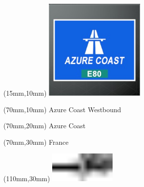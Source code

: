 \null\newpage
\begin{textblock*}{50mm}(15mm,10mm)%
\includegraphics[width=50mm]{LG/2015-05-20_00073.png}
\end{textblock*}
\begin{textblock*}{130mm}(70mm,10mm)%
{\fontsize{20}{20}\selectfont Azure Coast Westbound}\\
\end{textblock*}
\begin{textblock*}{120mm}(70mm,20mm)%
{\fontsize{16}{16}\selectfont Azure Coast}\\
\end{textblock*}
\begin{textblock*}{120mm}(70mm,30mm)%
{\fontsize{12}{12}\selectfont France}
\end{textblock*}
\begin{textblock*}{30mm}(110mm,30mm)%
\centering
\includegraphics[height=15mm]{icons/tofinish.pdf}
\end{textblock*}
